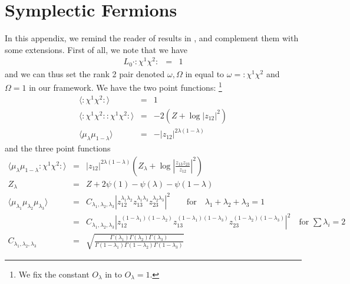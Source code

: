 \documentclass[12pt]{article}
\numberwithin{equation}{section}
\numberwithin{equation}{section}
\numberwithin{table}{section}\setlength{\multlinegap}{25pt}
\begin{document}
\section{Symplectic Fermions}
\label{symplecticfermions}
In this appendix, we remind the reader of results in \cite{Kausch:2000fu}, and complement them with some
extensions. First of all, we note that we have 
\begin{eqnarray}
L_0 \cdot : \chi^1 \chi^2: &=& 1
\end{eqnarray}
and we can thus set the rank 2 pair denoted $\omega,\Omega$ in \cite{Kausch:2000fu} equal to $\omega=:\chi^1 \chi^2$ and $\Omega =1$ in our framework.
We have the two point functions: \footnote{We fix the constant $O_\lambda$ in \cite{Kausch:2000fu} to $O_\lambda=1$.}
\begin{eqnarray}
\langle :\chi^1 \chi^2 : \rangle &=& 1
\nonumber \\
\langle :\chi^1 \chi^2 : :\chi^1 \chi^2 : \rangle &=&
-2(Z+\log |z_{12}|^2)
\nonumber \\
\langle \mu_{\lambda} \mu_{1-\lambda} \rangle &=& - |z_{12}|^{2 \lambda (1-\lambda)}
\end{eqnarray}
and the three point functions
\begin{eqnarray}
\langle  \mu_{\lambda} \mu_{1-\lambda} : \chi^1 \chi^2: \rangle &=&  |z_{12}|^{2 \lambda (1-\lambda)}
\left( Z_\lambda + \log | \frac{z_{13}z_{23}}{z_{12}}|^2 \right)
\nonumber \\
Z_{\lambda} &=& Z + 2 \psi(1)-\psi(\lambda)-\psi(1-\lambda)
\nonumber \\
\langle \mu_{\lambda_1} \mu_{\lambda_2} \mu_{\lambda_3} \rangle
&=& 
C_{\lambda_1,\lambda_2,\lambda_3} |z_{12}^{\lambda_1 \lambda_2}z_{13}^{\lambda_1 \lambda_3}z_{23}^{\lambda_2 \lambda_3}|^2
\qquad \mbox{for} \quad \lambda_1+\lambda_2+\lambda_3 =1
\nonumber \\
&=& C_{\lambda_1,\lambda_2,\lambda_3} |z_{12}^{(1-\lambda_1)(1- \lambda_2)}z_{13}^{(1-\lambda_1)(1- \lambda_3)}z_{23}^{(1-\lambda_2)(1- \lambda_3)}|^2
\quad \mbox{for} \, \,  \sum \lambda_i =2
\nonumber \\
C_{\lambda_1,\lambda_2,\lambda_3} &=& \sqrt{ \frac{\Gamma(\lambda_1)\Gamma(\lambda_2)\Gamma(\lambda_3)}{\Gamma(1-\lambda_1)\Gamma(1-\lambda_2)\Gamma(1-\lambda_3)}}
\end{eqnarray}
\end{document}
